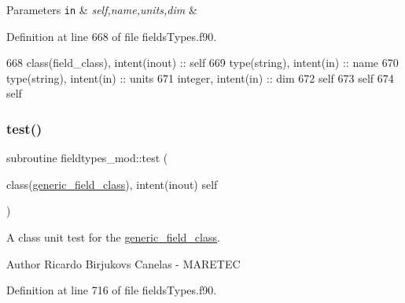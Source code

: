 \begin{DoxyParams}[1]{Parameters}
\mbox{\tt in}  & {\em self,name,units,dim} & \\
\hline
\end{DoxyParams}


Definition at line 668 of file fields\+Types.\+f90.


\begin{DoxyCode}
668     \textcolor{keywordtype}{class}(field\_class), \textcolor{keywordtype}{intent(inout)} :: self
669     \textcolor{keywordtype}{type}(string), \textcolor{keywordtype}{intent(in)} :: name
670     \textcolor{keywordtype}{type}(string), \textcolor{keywordtype}{intent(in)} :: units
671     \textcolor{keywordtype}{integer}, \textcolor{keywordtype}{intent(in)} :: dim
672     self%
673     self%
674     self%
\end{DoxyCode}
\mbox{\label{namespacefieldtypes__mod_a0babd6327ed77199d5437d17de34bafe}} 
\subsubsection{\texorpdfstring{test()}{test()}}
{\footnotesize\ttfamily subroutine fieldtypes\+\_\+mod\+::test (\begin{DoxyParamCaption}\item[{class(\mbox{\hyperlink{structfieldtypes__mod_1_1generic__field__class}{generic\+\_\+field\+\_\+class}}), intent(inout)}]{self }\end{DoxyParamCaption})\hspace{0.3cm}{\ttfamily [private]}}



A class \textquotesingle{}unit\textquotesingle{} test for the \mbox{\hyperlink{structfieldtypes__mod_1_1generic__field__class}{generic\+\_\+field\+\_\+class}}. 

\begin{DoxyAuthor}{Author}
Ricardo Birjukovs Canelas -\/ M\+A\+R\+E\+T\+EC 
\end{DoxyAuthor}


Definition at line 716 of file fields\+Types.\+f90.


